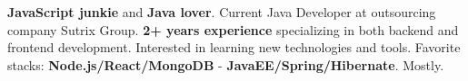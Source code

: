 

\begin{cvparagraph}

\textbf{JavaScript junkie} and \textbf{Java lover}. Current Java Developer at outsourcing company Sutrix Group. \textbf{2+ years experience} specializing in both backend and frontend development. Interested in learning new technologies and tools. Favorite stacks: \textbf{Node.js/React/MongoDB} - \textbf{JavaEE/Spring/Hibernate}. Mostly.
\end{cvparagraph}
